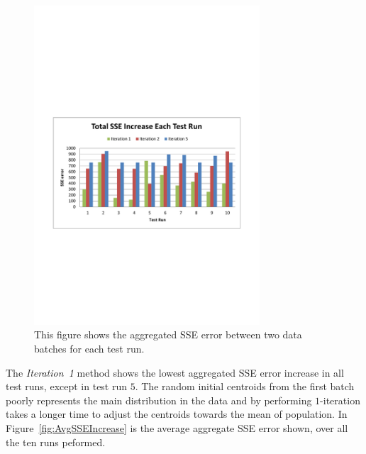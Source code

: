 \begin{figure}[ht]
\centering
\includegraphics[trim = 10mm 90mm 10mm 100mm, clip, width=0.75\textwidth]{Figures/experiments/zdataWO_TotalSSEIncreaseEachTestRun.pdf}
\caption{This figure shows the aggregated SSE error between two data batches for each test run.}
\label{fig:TotalSSEIncreaseEachTestRun}
\end{figure}

The \textit{Iteration~1} method shows the lowest aggregated SSE error increase in all test runs, except in test run $5$. The random initial centroids from the first batch poorly represents the main distribution in the data and by performing $1$-iteration takes a longer time to adjust the centroids towards the mean of population. In Figure~\ref{fig:AvgSSEIncrease} is the average aggregate SSE error shown, over all the ten runs peformed.


